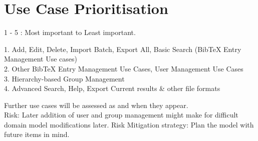 \section*{Use Case Prioritisation}

1 - 5 : Most important to Least important.

1. Add, Edit, Delete, Import Batch, Export All, Basic Search (BibTeX Entry Management Use cases) \\
2. Other BibTeX Entry Management Use Cases, User Management Use Cases \\
3. Hierarchy-based Group Management \\
4. Advanced Search, Help, Export Current results \& other file formats

Further use cases will be assessed as and when they appear. \\


Risk: Later addition of user and group management might make for difficult domain model modifications later.
Risk Mitigation strategy: Plan the model with future items in mind.

